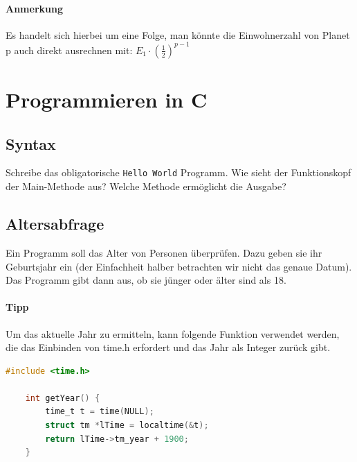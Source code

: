 \documentclass[11pt, a4paper]{article}
\begin{document}
\paragraph{Anmerkung} Es handelt sich hierbei um eine Folge, man könnte die Einwohnerzahl von Planet p auch direkt ausrechnen mit: $E_1 \cdot \left(\frac{1}{2}\right)^{p-1}$


\newpage
\section{Programmieren in C}
\subsection{Syntax}
Schreibe das obligatorische \texttt{Hello World} Programm. Wie sieht der Funktionskopf der Main-Methode aus? Welche Methode ermöglicht die Ausgabe?


\subsection{Altersabfrage}
Ein Programm soll das Alter von Personen überprüfen. Dazu geben sie ihr Geburtsjahr ein (der Einfachheit halber betrachten wir nicht das genaue Datum). Das Programm gibt dann aus, ob sie jünger oder älter sind als 18.

\paragraph{Tipp} Um das aktuelle Jahr zu ermitteln, kann folgende Funktion verwendet werden, die das Einbinden von time.h erfordert und das Jahr als Integer zurück gibt.
\begin{lstlisting}[language=C]
	#include <time.h>

	int getYear() {
		time_t t = time(NULL);
		struct tm *lTime = localtime(&t);
		return lTime->tm_year + 1900;
	}
\end{lstlisting}

\end{document}
